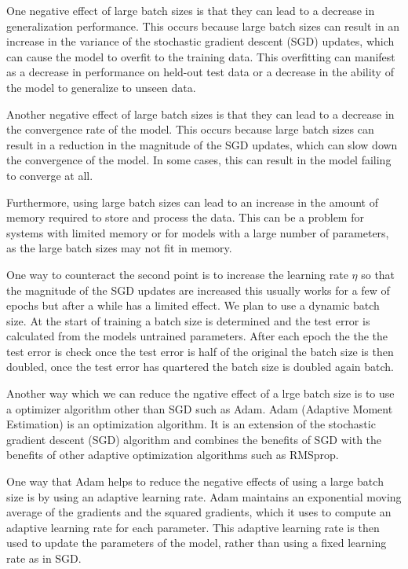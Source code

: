 \documentclass[11pt]{article}
\begin{document}
One negative effect of large batch sizes is that they can lead to a decrease in generalization performance. This occurs because large batch sizes can result in an increase in the variance of the stochastic gradient descent (SGD) updates, which can cause the model to overfit to the training data. This overfitting can manifest as a decrease in performance on held-out test data or a decrease in the ability of the model to generalize to unseen data.

Another negative effect of large batch sizes is that they can lead to a decrease in the convergence rate of the model. This occurs because large batch sizes can result in a reduction in the magnitude of the SGD updates, which can slow down the convergence of the model. In some cases, this can result in the model failing to converge at all.

Furthermore, using large batch sizes can lead to an increase in the amount of memory required to store and process the data. This can be a problem for systems with limited memory or for models with a large number of parameters, as the large batch sizes may not fit in memory.

One way to counteract the second point is to increase the learning rate $\eta$ so that the magnitude of the SGD updates are increased this usually works for a few of epochs but after a while has a limited effect. We plan to use a dynamic batch size. At the start of training a batch size is determined and the test error is calculated from the models untrained parameters. After each epoch the the the test error is check once the test error is half of the original the batch size is then doubled, once the test error has quartered the batch size is doubled again batch.

Another way which we can reduce the ngative effect of a lrge batch size is to use a optimizer algorithm other than SGD such as Adam. Adam (Adaptive Moment Estimation) is an optimization algorithm. It is an extension of the stochastic gradient descent (SGD) algorithm and combines the benefits of SGD with the benefits of other adaptive optimization algorithms such as RMSprop. 

One way that Adam helps to reduce the negative effects of using a large batch size is by using an adaptive learning rate. Adam maintains an exponential moving average of the gradients and the squared gradients, which it uses to compute an adaptive learning rate for each parameter. This adaptive learning rate is then used to update the parameters of the model, rather than using a fixed learning rate as in SGD. 
\end{document}
